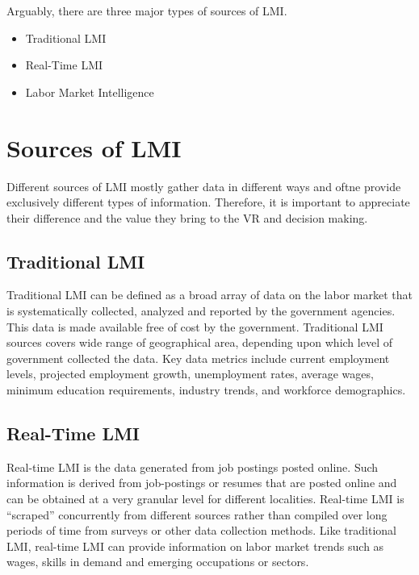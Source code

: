\documentclass[]{book}
\providecommand{\tightlist}{%
  \setlength{\itemsep}{0pt}\setlength{\parskip}{0pt}}
\theoremstyle{definition}
\theoremstyle{definition}
\theoremstyle{definition}
\theoremstyle{remark}
\begin{document}
Arguably, there are three major types of sources of LMI.

\begin{itemize}
\tightlist
\item
  Traditional LMI
\item
  Real-Time LMI
\item
  Labor Market Intelligence
\end{itemize}

\section{Sources of LMI}\label{sources-of-lmi}

Different sources of LMI mostly gather data in different ways and oftne
provide exclusively different types of information. Therefore, it is
important to appreciate their difference and the value they bring to the
VR and decision making.

\subsection{Traditional LMI}\label{traditional-lmi}

Traditional LMI can be defined as a broad array of data on the labor
market that is systematically collected, analyzed and reported by the
government agencies. This data is made available free of cost by the
government. Traditional LMI sources covers wide range of geographical
area, depending upon which level of government collected the data. Key
data metrics include current employment levels, projected employment
growth, unemployment rates, average wages, minimum education
requirements, industry trends, and workforce demographics.

\subsection{Real-Time LMI}\label{real-time-lmi}

Real-time LMI is the data generated from job postings posted online.
Such information is derived from job-postings or resumes that are posted
online and can be obtained at a very granular level for different
localities. Real-time LMI is ``scraped'' concurrently from different
sources rather than compiled over long periods of time from surveys or
other data collection methods. Like traditional LMI, real-time LMI can
provide information on labor market trends such as wages, skills in
demand and emerging occupations or sectors.
\end{document}
